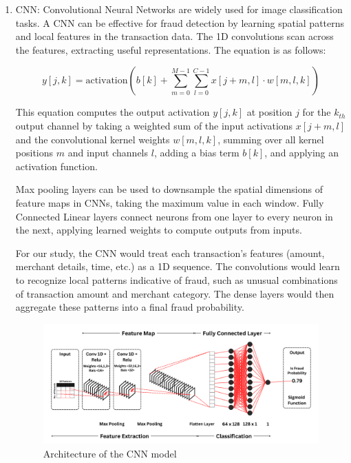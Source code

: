 \documentclass[pdflatex,sn-mathphys-num]{sn-jnl}%
\begin{document}
\begin{enumerate}[label=(\roman*),itemsep=10pt]
    

\item CNN: Convolutional Neural Networks are widely used for image classification tasks. A CNN can be effective for fraud detection by learning spatial patterns and local features in the transaction data. The 1D convolutions scan across the features, extracting useful representations. The equation is as follows:

\begin{equation}
y\left[j,k\right]=\mathrm{activation}\left(b\left[k\right]+\sum_{m=0}^{M-1}\sum_{l=0}^{C-1}x\left[j+m,l\right]\cdot w\left[m,l,k\right]\right)
\end{equation}

This equation computes the output activation $y\left[j,k\right]$ at position $j$ for the $k_{th}$ output channel by taking a weighted sum of the input activations $x\left[j+m,l\right]$ and the convolutional kernel weights $w\left[m,l,k\right]$, summing over all kernel positions $m$ and input channels $l$, adding a bias term $b\left[k\right] $, and applying an activation function.

Max pooling layers can be used to downsample the spatial dimensions of feature maps in CNNs, taking the maximum value in each window. Fully Connected Linear layers connect neurons from one layer to every neuron in the next, applying learned weights to compute outputs from inputs.

For our study, the CNN would treat each transaction's features (amount, merchant details, time, etc.) as a 1D sequence. The convolutions would learn to recognize local patterns indicative of fraud, such as unusual combinations of transaction amount and merchant category. The dense layers would then aggregate these patterns into a final fraud probability.

\clearpage

\begin{figure}[h]
\centering
\includegraphics[width=1.0\textwidth]{CNN Model Architecture.png}
\caption{Architecture of the CNN model}\label{fig1}
\end{figure}


\end{enumerate}
\end{document}

